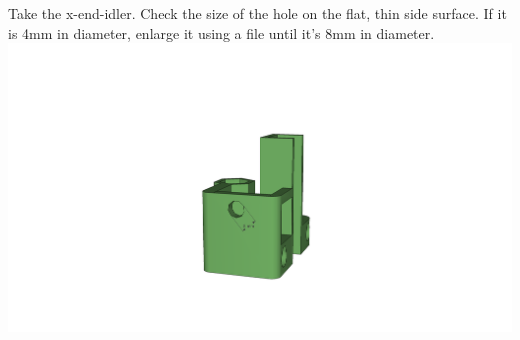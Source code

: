\documentclass[twoside,a4paper,titlepage]{memoir}
\begin{document}
	\section{}
	Take the x-end-idler. Check the size of the hole on the flat, thin side surface. If it is 4mm in diameter,
	enlarge it using a file until it's 8mm in diameter.\\
	\includegraphics[width=1\linewidth]{graphics/ch7_2.png}
	
\end{document}
